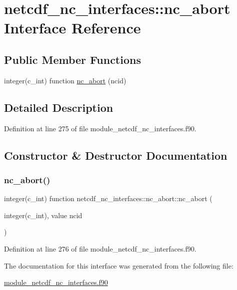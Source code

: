 \hypertarget{interfacenetcdf__nc__interfaces_1_1nc__abort}{}\section{netcdf\+\_\+nc\+\_\+interfaces\+:\+:nc\+\_\+abort Interface Reference}
\label{interfacenetcdf__nc__interfaces_1_1nc__abort}
\subsection*{Public Member Functions}
\begin{DoxyCompactItemize}
\item 
integer(c\+\_\+int) function \hyperlink{interfacenetcdf__nc__interfaces_1_1nc__abort_ab614830b312a3a047bb8a7ce2fc0beca}{nc\+\_\+abort} (ncid)
\end{DoxyCompactItemize}


\subsection{Detailed Description}


Definition at line 275 of file module\+\_\+netcdf\+\_\+nc\+\_\+interfaces.\+f90.



\subsection{Constructor \& Destructor Documentation}
\mbox{\label{interfacenetcdf__nc__interfaces_1_1nc__abort_ab614830b312a3a047bb8a7ce2fc0beca}} 
\subsubsection{\texorpdfstring{nc\+\_\+abort()}{nc\_abort()}}
{\footnotesize\ttfamily integer(c\+\_\+int) function netcdf\+\_\+nc\+\_\+interfaces\+::nc\+\_\+abort\+::nc\+\_\+abort (\begin{DoxyParamCaption}\item[{integer(c\+\_\+int), value}]{ncid }\end{DoxyParamCaption})}



Definition at line 276 of file module\+\_\+netcdf\+\_\+nc\+\_\+interfaces.\+f90.



The documentation for this interface was generated from the following file\+:\begin{DoxyCompactItemize}
\item 
\hyperlink{module__netcdf__nc__interfaces_8f90}{module\+\_\+netcdf\+\_\+nc\+\_\+interfaces.\+f90}\end{DoxyCompactItemize}
